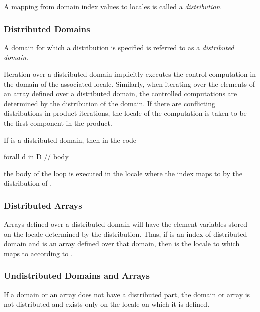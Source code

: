 A mapping from domain index values to locales is called a {\em
distribution}.

\subsubsection{Distributed Domains}
\label{Distributed_Domains}

A domain for which a distribution is specified is referred to as a
{\em distributed domain}.

Iteration over a distributed domain implicitly executes the control
computation in the domain of the associated locale.  Similarly, when
iterating over the elements of an array defined over a distributed
domain, the controlled computations are determined by the distribution
of the domain.  If there are conflicting distributions in product
iterations, the locale of the computation is taken to be the first
component in the product.

\begin{example}
If  is a distributed domain, then in the code
\begin{chapel}
forall d in D {
  // body
}
\end{chapel}
the body of the loop is executed in the locale where the
index  maps to by the distribution of .
\end{example}

\subsubsection{Distributed Arrays}
\label{Distributed_Arrays}

Arrays defined over a distributed domain will have the element
variables stored on the locale determined by the distribution.  Thus,
if  is an index of distributed domain  and  is
an array defined over that domain, then  is the
locale to which  maps to according to .

\subsubsection{Undistributed Domains and Arrays}
\label{Undistributed_Domains_and_Arrays}

If a domain or an array does not have a distributed part, the domain
or array is not distributed and exists only on the locale on which it
is defined.

